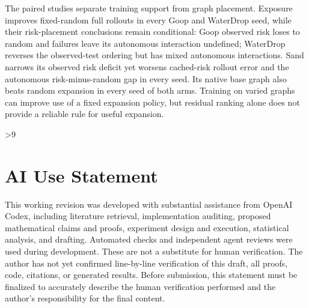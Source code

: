 The paired studies separate training support from graph placement. Exposure improves fixed-random full rollouts in every Goop and WaterDrop seed, while their risk-placement conclusions remain conditional: Goop observed risk loses to random and failures leave its autonomous interaction undefined; WaterDrop reverses the observed-test ordering but has mixed autonomous interactions. Sand narrows its observed risk deficit yet worsens cached-risk rollout error and the autonomous risk-minus-random gap in every seed. Its native base graph also beats random expansion in every seed of both arms. Training on varied graphs can improve use of a fixed expansion policy, but residual ranking alone does not provide a reliable rule for useful expansion.

\clearpage
{}
\ifnum\value{page}>9
  \PackageError{research-revision}{Main text exceeds the eight-page limit}{Shorten the main text before submission.}
\fi
\section*{AI Use Statement}
This working revision was developed with substantial assistance from OpenAI Codex, including literature retrieval, implementation auditing, proposed mathematical claims and proofs, experiment design and execution, statistical analysis, and drafting. Automated checks and independent agent reviews were used during development. These are not a substitute for human verification. The author has not yet confirmed line-by-line verification of this draft, all proofs, code, citations, or generated results. Before submission, this statement must be finalized to accurately describe the human verification performed and the author's responsibility for the final content.

